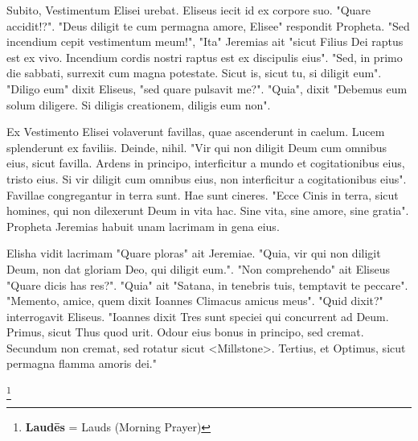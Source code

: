 Subito, Vestimentum Elisei urebat. Eliseus iecit id ex corpore suo. "Quare accidit!?". "Deus diligit te cum permagna amore, Elisee" respondit Propheta. "Sed incendium cepit vestimentum meum!", "Ita" Jeremias ait "sicut Filius Dei raptus est ex vivo. Incendium cordis nostri raptus est ex discipulis eius". "Sed, in primo die sabbati, surrexit cum magna potestate. Sicut is, sicut tu, si diligit eum". "Diligo eum" dixit Eliseus, "sed quare pulsavit me?". "Quia", dixit "Debemus eum solum diligere. Si diligis creationem, diligis eum non". \par 
Ex Vestimento Elisei volaverunt favillas, quae ascenderunt in caelum. Lucem splenderunt ex faviliis. Deinde, nihil. "Vir qui non diligit Deum cum omnibus eius, sicut favilla. Ardens in principo, interficitur a mundo et cogitationibus eius, tristo eius. Si vir diligit cum omnibus eius, non interficitur a cogitationibus eius". Favillae congregantur in terra sunt. Hae sunt cineres. "Ecce Cinis in terra, sicut homines, qui non dilexerunt Deum in vita hac. Sine vita, sine amore, sine gratia". Propheta Jeremias habuit unam lacrimam in gena eius. \par 
Elisha vidit lacrimam "Quare ploras" ait Jeremiae. "Quia, vir qui non diligit Deum, non dat gloriam Deo, qui diligit eum.". "Non comprehendo" ait Eliseus "Quare dicis has res?". "Quia" ait "Satana, in tenebris tuis, temptavit te peccare". "Memento, amice, quem dixit Ioannes Climacus amicus meus". "Quid dixit?" interrogavit Eliseus. "Ioannes dixit \: Tres sunt speciei qui concurrent ad Deum. Primus, sicut Thus quod urit. Odour eius bonus in principo, sed cremat. Secundum non cremat, sed rotatur sicut <Millstone>. Tertius, et Optimus, sicut permagna flamma amoris dei." 


\footnote{\textbf{Laudēs} = Lauds (Morning Prayer)}

